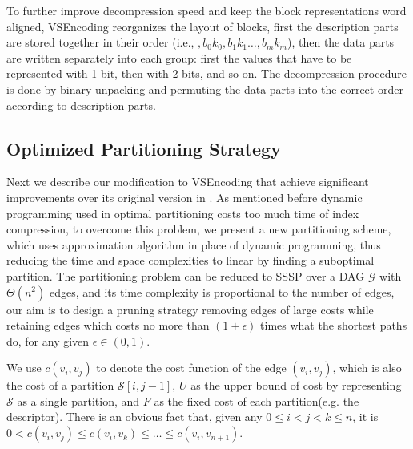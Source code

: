 \documentclass[runningheads,a4paper]{llncs}
\begin{document}
To further improve decompression speed and keep the block representations word aligned, VSEncoding reorganizes the layout of blocks, first the description parts are stored together in their order (i.e., $,b_{0}k_{0},b_{1}k_{1}\dots,b_{m}k_{m}$), then the data parts are written separately into each group: first the values that have to be represented with 1 bit, then with 2 bits, and so on. The decompression procedure is done by binary-unpacking and permuting the data parts into the correct order according to description parts.

\subsection{Optimized Partitioning Strategy}

Next we describe our modification to VSEncoding that achieve significant improvements over its original version in \cite{silvestri2010vsencoding}. As mentioned before dynamic programming used in optimal partitioning costs too much time of index compression, to overcome this problem, we present a new partitioning scheme, which uses approximation algorithm in place of dynamic programming, thus reducing the time and space complexities to linear by finding a suboptimal partition. The partitioning problem can be reduced to SSSP over a DAG $\mathcal{G}$ with $\Theta\left(n^{2}\right)$ edges, and its time complexity is proportional to the number of edges,
our aim is to design a pruning strategy removing edges of large costs while retaining edges which costs no more than $\left(1+\epsilon \right)$ times what the shortest paths do, for any given $\epsilon\in\left(0,1\right)$.

We use $c\left(v_{i},v_{j}\right)$ to denote the cost function of the edge $\left(v_{i},v_{j}\right)$, which is also the cost of a partition $\mathcal{S}\left[i,j-1 \right]$, $U$ as the upper bound of cost by representing $\mathcal{S}$ as a single partition, and $F$ as the fixed cost of each partition(e.g. the descriptor). There is an obvious fact that, given any $0\leqslant i < j < k \leqslant n$, it is $ 0 < c\left(v_{i},v_{j}\right)\leqslant c\left(v_{i},v_{k}\right)\leqslant \ldots \leqslant c\left(v_{i},v_{n+1}\right)$.
\end{document}
